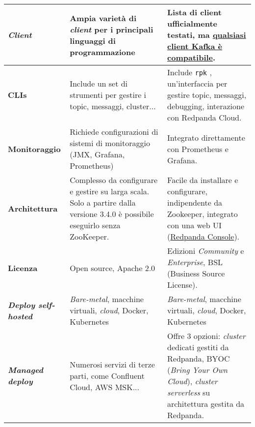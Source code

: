 \begin{longtable}{|>{\centering\arraybackslash}p{}|>{\centering\arraybackslash}p{}|>{\centering\arraybackslash}p{}|}
	\hline
	\textbf{\textit{Client}}                    & Ampia varietà di \textit{client} per i principali linguaggi di programmazione                                                                               & Lista di client ufficialmente testati, ma \href{https://docs.redpanda.com/current/develop/kafka-clients/}{qualsiasi client Kafka è compatibile}.                       \\
	\hline
	\textbf{CLIs}                               & Include un set di strumenti per gestire i topic, messaggi, cluster...                                                                                       & Include \texttt{rpk} , un'interfaccia per gestire topic, messaggi, debugging, interazione con Redpanda Cloud.                                                          \\
	\hline
	\textbf{Monitoraggio}                       & Richiede configurazioni di sistemi di monitoraggio (JMX, Grafana, Prometheus)                                                                               & Integrato direttamente con Prometheus e Grafana.                                                                                                                       \\
	\hline
	\textbf{Architettura}                       & Complesso da configurare e gestire su larga scala. Solo a partire dalla versione 3.4.0 è possibile eseguirlo senza ZooKeeper.                               & Facile da installare e configurare, indipendente da Zookeeper, integrato con una web UI (\href{https://redpanda.com/redpanda-console-kafka-ui}{Redpanda Console}).     \\
	\hline
	\textbf{Licenza}                            & Open source, Apache 2.0                                                                                                                                     & Edizioni \textit{Community} e \textit{Enterprise}, BSL (Business Source License).                                                                                      \\
	\hline
	\textbf{\textit{Deploy self-hosted}}        & \textit{Bare-metal}, macchine virtuali, \textit{cloud}, Docker, Kubernetes & \textit{Bare-metal}, macchine virtuali, \textit{cloud}, Docker, Kubernetes            \\
	\hline
	\textbf{\textit{Managed deploy}}            & Numerosi servizi di terze parti, come Confluent Cloud, AWS MSK...                                                                                           & Offre 3 opzioni: \textit{cluster} dedicati gestiti da Redpanda, BYOC (\textit{Bring Your Own Cloud}), \textit{cluster serverless} su architettura gestita da Redpanda. \\

\end{longtable}
